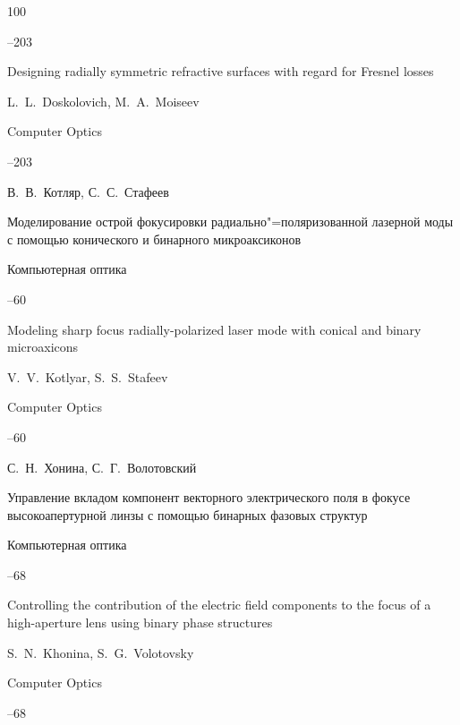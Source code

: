 \begin{thebibliography}{100}


--203

\misctransl

\paper Designing radially symmetric refractive surfaces with regard for Fresnel losses

\by L.~L.~Doskolovich, M.~A.~Moiseev

\jour Computer Optics




--203




\by В.~В.~Котляр, С.~С.~Стафеев

\paper Моделирование острой фокусировки радиально"=поляризованной лазерной моды с помощью конического и бинарного микроаксиконов

\jour Компьютерная оптика




--60

\misctransl

\paper Modeling sharp focus radially-polarized laser mode with conical and binary microaxicons 

\by V.~V.~Kotlyar, S.~S.~Stafeev

\jour Computer Optics




--60








\by С.~Н.~Хонина, С.~Г.~Волотовский

\paper Управление вкладом компонент векторного электрического поля в фокусе высокоапертурной линзы с помощью бинарных фазовых структур

\jour Компьютерная оптика




--68

\misctransl

\paper Controlling the contribution of the electric field components to the focus of a high-aperture lens using binary phase structures

\by S.~N.~Khonina, S.~G.~Volotovsky

\jour Computer Optics




--68







\end{thebibliography}
